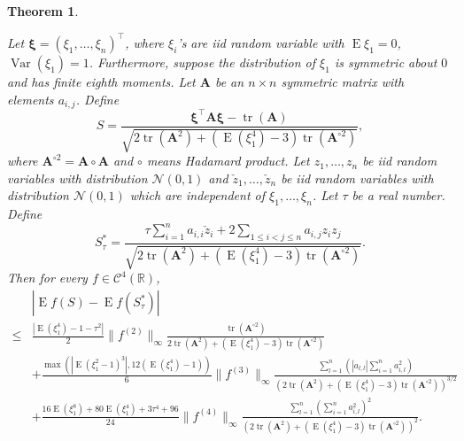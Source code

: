 \documentclass[bj]{imsart}
\DeclareMathOperator{\mytr}{tr}
\DeclareMathOperator{\myE}{E}
\DeclareMathOperator{\myVar}{Var}
\newcommand{\BA}{\mathbf{A}}    \newcommand{\BB}{\mathbf{B}}    \newcommand{\BC}{\mathbf{C}}    \newcommand{\BD}{\mathbf{D}}    \newcommand{\BE}{\mathbf{E}}    \newcommand{\BF}{\mathbf{F}}    \newcommand{\BG}{\mathbf{G}}    \newcommand{\BH}{\mathbf{H}}    \newcommand{\BI}{\mathbf{I}}    \newcommand{\BJ}{\mathbf{J}}    \newcommand{\BK}{\mathbf{K}}    \newcommand{\BL}{\mathbf{L}}
\newcommand{\bfsym}[1]{\ensuremath{\boldsymbol{#1}}}
\def\bxi{\bfsym {\xi}}
\theoremstyle{plain}
\newtheorem{theorem}{\quad\quad Theorem}
\theoremstyle{definition}
\theoremstyle{remark}
\begin{document}
\begin{theorem}\label{TheoremLindeberg}

    Let $\bxi=(\xi_1,\ldots,\xi_n)^\top$, where $\xi_i$'s are iid random variable with $\myE \xi_1=0$, $\myVar (\xi_1)=1$.
    Furthermore, suppose the distribution of  $\xi_1$ is symmetric about $0$ and has finite eighth moments.
    Let $\BA$ be an $n\times n$ symmetric matrix with elements $a_{i,j}$.
Define
    \begin{equation*}
        S=\frac{
            \bxi^\top \BA \bxi-\mytr (\BA)
        }{
            \sqrt{
    2 \mytr(\BA^2)
    +
    (\myE (\xi_1^4)-3) \mytr(\BA^{\circ 2})
            }             
        },
    \end{equation*}
    where $\BA^{\circ 2}=\BA\circ \BA$ and $\circ$ means Hadamard product.
    Let $z_1,\ldots,z_n$  be iid random variables with distribution $\mathcal N (0, 1) $ and $\check z_1, \ldots, \check z_n$ be iid random variables with distribution $\mathcal N (0,1)$ which are independent of $\xi_1,\ldots, \xi_n$.
    Let $\tau$ be a real number.
    Define
    \begin{equation*}
        S_\tau^* =
        \frac{
            \tau \sum_{i=1}^n  a_{i,i}\check z_i
        +2\sum_{1\leq i <j \leq n} a_{i,j} z_i z_j
    }
    {
            \sqrt{
    2 \mytr(\BA^2)
    +
    (\myE (\xi_1^4)-3) \mytr(\BA^{\circ 2})
            }             
        }.
    \end{equation*}
    Then for every $f\in \mathscr C^4(\mathbb R)$,
    \begin{equation}\label{eq:longInequality}
        \begin{split}
             &
              \left| \myE f(S)-\myE f(S_\tau^*)\right|
             \\
\leq&
\frac{
\left|
\myE (\xi_1^4)-1
            -
            \tau^2
\right|
}{2}
\|f^{(2)}\|_\infty
\frac{
    \mytr(\BA^{\circ 2})
}{
    2 \mytr(\BA^2)
    +
    (\myE (\xi_1^4)-3) \mytr(\BA^{\circ 2})
}
\\
&
            +
            \frac{
            \max\left(
    \left|\myE (\xi_1^2-1)^3\right|
            ,
12 (\myE (\xi_1^4)-1)
        \right)
            }{6} \|f^{(3)}\|_\infty
            \frac{
            \sum_{l=1}^n 
            \left(|a_{l,l}|
         \sum_{i=1}^{n} a_{i,l}^2 
     \right)
 }{
    \left(
        2 \mytr(\BA^2)
    +
    (\myE (\xi_1^4)-3) \mytr(\BA^{\circ 2})
\right)^{3/2}
 }
         \\
            &+
            \frac{
             16 \myE (\xi_1^8) + 80 \myE (\xi_1^4) + 3\tau^4 + 96 
            }{24} \|f^{(4)} \|_{\infty} 
            \frac{
                \sum_{l=1}^n \left( \sum_{i=1}^n a_{i,l}^2 \right)^2
            }{
            \left(
        2 \mytr(\BA^2)
    +
    (\myE (\xi_1^4)-3)\mytr(\BA^{\circ 2})
\right)^{2}
            }
            .
        \end{split}
    \end{equation}
    \label{approximation}
\end{theorem}
\end{document}
